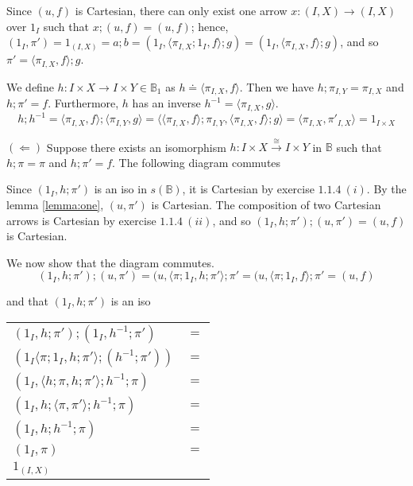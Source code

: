 \documentclass{article}
\begin{document}
Since $(u,f)$ is Cartesian,
there can only exist one arrow $x : (I,X) \to (I,X)$ over $1_I$ such that $x;(u,f) = (u,f)$; hence, 
$(1_I, \pi') = 1_{(I,X)} = a;b = (1_I, \langle \pi_{I,X};1_I , f \rangle; g) = (1_I, \langle \pi_{I,X} , f \rangle; g)$,
and so $\pi' = \langle \pi_{I,X} , f \rangle; g$.

We define $h : I \times X \to I \times Y \in \mathbb B_1$ as $h \doteq \langle \pi_{I,X}, f \rangle$. Then we have $h;\pi_{I,Y} = \pi_{I,X}$ and
$h;\pi' = f$. Furthermore, $h$ has an inverse $h^{-1} = \langle \pi_{I,X}, g \rangle$.
$$ h;h^{-1} = \langle \pi_{I,X}, f \rangle; \langle \pi_{I,Y}, g \rangle = \langle \langle \pi_{I,X}, f \rangle; \pi_{I,Y} 
  , \langle \pi_{I,X}, f \rangle; g \rangle = \langle \pi_{I,X} , \pi'_{I,X} \rangle = 1_{I \times X}$$
 
$(\Leftarrow)$ Suppose there exists an isomorphism $h : I \times X \overset{\cong}{\to} I \times Y$
in $\mathbb B$ such that $h;\pi = \pi$ and $h;\pi' = f$. The following diagram commutes
\begin{center}
\end{center}

Since $(1_I, h;\pi')$ is an iso in $s(\mathbb B)$, it is Cartesian by exercise $1.1.4~(i)$. By the lemma \ref{lemma:one},
$(u,\pi')$ is Cartesian. The composition of two Cartesian arrows is Cartesian by exercise
$1.1.4~(ii)$, and so $(1_I, h;\pi');(u,\pi') = (u,f)$ is Cartesian. 

We now show that the diagram commutes.
$$(1_I, h;\pi');(u,\pi') = (u, \langle \pi;1_I,h;\pi' \rangle;\pi' = (u, \langle \pi;1_I, f \rangle ; \pi' = (u,f) $$

and that $(1_I, h;\pi')$ is an iso
\begin{center}
\begin{tabular}{ll}
$(1_I, h;\pi');(1_I,h^{-1};\pi')$ & $=$ \\ 
$(1_I \langle \pi;1_I, h;\pi' \rangle;(h^{-1};\pi'))$ & $=$ \\
$(1_I, \langle h;\pi, h;\pi' \rangle;h^{-1};\pi)$ & $=$ \\
$(1_I, h;\langle \pi, \pi' \rangle;h^{-1};\pi)$ & $=$ \\
$(1_I, h;h^{-1};\pi)$ & $=$ \\
$(1_I, \pi)$ & $=$ \\
$1_{(I,X)}$ &   
\end{tabular}
\end{center}
 
\end{document}
